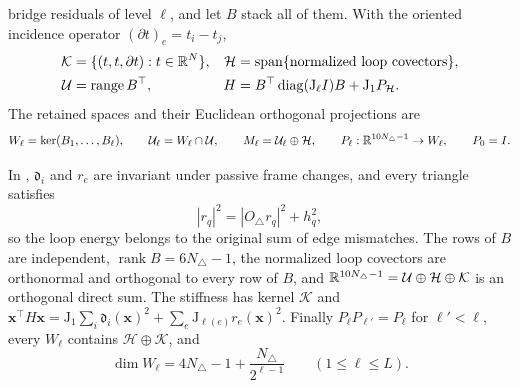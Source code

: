 bridge residuals of level \(\ell\), and let \(B\) stack all of them. With the
oriented incidence operator \((\partial t)_e=t_i-t_j\),
\begin{equation}
\begin{aligned}
\mathcal K&=\{(t,t,\partial t):t\in\mathbb R^N\},&
\mathcal H&=\operatorname{span}\{\text{normalized loop covectors}\},\\
\mathcal U&=\operatorname{range}B^\top,&
H&=B^\top\operatorname{diag}(\mathrm J_\ell I)B+\mathrm J_1P_{\mathcal H}.
\end{aligned}
\label{eq:rg-formation-orthogonal-split}
\end{equation}
The retained spaces and their Euclidean orthogonal projections are
\begin{equation}
W_\ell=\ker(B_1,\ldots,B_\ell),\qquad
\mathcal U_\ell=W_\ell\cap\mathcal U,\qquad
M_\ell=\mathcal U_\ell\oplus\mathcal H,\qquad
P_\ell:\mathbb R^{10N_\triangle-1}\to W_\ell,\qquad P_0=I.
\label{eq:rg-formation-projections}
\end{equation}

In , \(\mathfrak d_i\) and \(r_e\) are
invariant under passive frame changes, and every triangle satisfies
\begin{equation}
|r_q|^2=|O_\triangle r_q|^2+h_q^2,
\label{eq:rg-formation-loop-decomposition}
\end{equation}
so the loop energy belongs to the original sum of edge mismatches. The rows of
\(B\) are independent, \(\operatorname{rank}B=6N_\triangle-1\), the normalized
loop covectors are orthonormal and orthogonal to every row of \(B\), and
\(\mathbb R^{10N_\triangle-1}=\mathcal U\oplus\mathcal H\oplus\mathcal K\) is an
orthogonal direct sum. The stiffness has kernel \(\mathcal K\) and
\(\mathbf x^\top H\mathbf x=\mathrm J_1\sum_i\mathfrak d_i(\mathbf x)^2
+\sum_e\mathrm J_{\ell(e)}r_e(\mathbf x)^2\). Finally
\(P_\ell P_{\ell'}=P_\ell\) for \(\ell'<\ell\), every \(W_\ell\) contains
\(\mathcal H\oplus\mathcal K\), and
\begin{equation}
\dim W_\ell=4N_\triangle-1+\frac{N_\triangle}{2^{\ell-1}}\qquad(1\le\ell\le L).
\label{eq:rg-formation-dimensions}
\end{equation}

